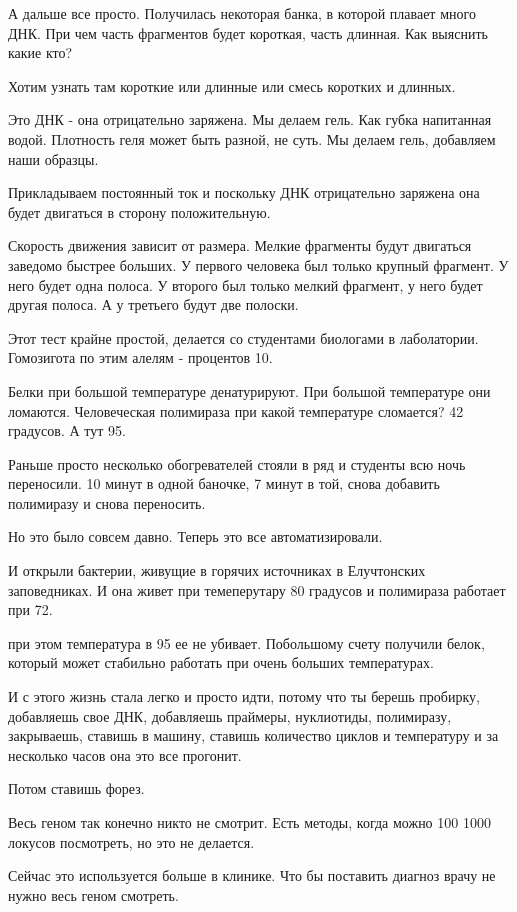 А дальше все просто. Получилась некоторая банка, в
которой плавает много ДНК. При чем часть фрагментов будет 
короткая, часть длинная. Как выяснить какие кто?

Хотим узнать там короткие или длинные или смесь коротких 
и длинных. 

Это ДНК - она отрицательно заряжена. Мы делаем гель. Как губка 
напитанная водой. Плотность геля может быть разной, не суть. 
Мы делаем гель, добавляем наши образцы. 

Прикладываем постоянный ток и поскольку ДНК
отрицательно заряжена она будет двигаться в сторону положительную. 

Скорость движения зависит от размера. Мелкие фрагменты будут двигаться 
заведомо быстрее больших. У первого человека был только крупный фрагмент. 
У него будет одна полоса. У второго был только мелкий фрагмент, 
у него будет другая полоса. А у третьего будут две полоски. 

Этот тест крайне простой, делается со студентами биологами в лаболатории. 
Гомозигота по этим алелям - процентов 10. 

Белки при большой температуре  денатурируют. При большой температуре они ломаются. 
Человеческая полимираза при какой температуре сломается? 42 градусов. А тут 
95. 

Раньше просто несколько обогревателей стояли в ряд и студенты всю ночь переносили. 
10 минут в одной баночке, 7 минут в той, снова добавить полимиразу и снова переносить. 

Но это было совсем давно. Теперь это все автоматизировали. 

И открыли бактерии, живущие в горячих источниках в 
Елучтонских заповедниках. И она живет при темеперутару 80 градусов и 
полимираза работает при 72. 

при этом температура в 95 ее не убивает. Побольшому счету получили белок, 
который может стабильно работать при очень больших температурах. 

И с этого жизнь стала легко и просто идти, потому что ты берешь пробирку, 
добавляешь свое ДНК, добавляешь праймеры, нуклиотиды, полимиразу, 
закрываешь, ставишь в машину, ставишь количество циклов и температуру и 
за несколько часов она это все прогонит. 

Потом ставишь форез. 

Весь геном так конечно никто не смотрит. Есть методы, когда 
можно 100 1000 локусов посмотреть, но это не делается. 

Сейчас это используется больше в клинике. Что бы поставить диагноз 
врачу не нужно весь геном смотреть. 

